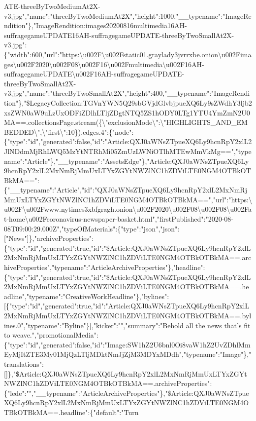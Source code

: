 ATE-threeByTwoMediumAt2X-v3.jpg","name":"threeByTwoMediumAt2X","height":1000,"\_\_typename":"ImageRendition"\},"ImageRendition:images20200816multimedia16AH-suffragegameUPDATE16AH-suffragegameUPDATE-threeByTwoSmallAt2X-v3.jpg":\{"width":600,"url":"https:\textbackslash{}u002F\textbackslash{}u002Fstatic01.graylady3jvrrxbe.onion\textbackslash{}u002Fimages\textbackslash{}u002F2020\textbackslash{}u002F08\textbackslash{}u002F16\textbackslash{}u002Fmultimedia\textbackslash{}u002F16AH-suffragegameUPDATE\textbackslash{}u002F16AH-suffragegameUPDATE-threeByTwoSmallAt2X-v3.jpg","name":"threeByTwoSmallAt2X","height":400,"\_\_typename":"ImageRendition"\},"\$LegacyCollection:TGVnYWN5Q29sbGVjdGlvbjpueXQ6Ly9sZWdhY3ljb2xsZWN0aW9uLzUxODFiZDlhLTljZDgtNTQ5ZS1hODY0LTg1YTU4YmZmN2U0MA==.collectionsPage.stream(\{\textbackslash{}"exclusionMode\textbackslash{}":\textbackslash{}"HIGHLIGHTS\_AND\_EMBEDDED\textbackslash{}",\textbackslash{}"first\textbackslash{}":10\}).edges.4":\{"node":\{"type":"id","generated":false,"id":"Article:QXJ0aWNsZTpueXQ6Ly9hcnRpY2xlL2JlNDdmMjRhLWQ5MzYtNTRhMi05ZmUzLWNiOTlhMTEwMmVkMg==","typename":"Article"\},"\_\_typename":"AssetsEdge"\},"Article:QXJ0aWNsZTpueXQ6Ly9hcnRpY2xlL2MxNmRjMmUxLTYxZGYtNWZlNC1hZDViLTE0NGM4OTBkOTBkMA==":\{"\_\_typename":"Article","id":"QXJ0aWNsZTpueXQ6Ly9hcnRpY2xlL2MxNmRjMmUxLTYxZGYtNWZlNC1hZDViLTE0NGM4OTBkOTBkMA==","url":"https:\textbackslash{}u002F\textbackslash{}u002Fwww.nytimes3xbfgragh.onion\textbackslash{}u002F2020\textbackslash{}u002F08\textbackslash{}u002F08\textbackslash{}u002Fat-home\textbackslash{}u002Fcoronavirus-newspaper-basket.html","firstPublished":"2020-08-08T09:00:29.000Z","typeOfMaterials":\{"type":"json","json":{[}"News"{]}\},"archiveProperties":\{"type":"id","generated":true,"id":"\$Article:QXJ0aWNsZTpueXQ6Ly9hcnRpY2xlL2MxNmRjMmUxLTYxZGYtNWZlNC1hZDViLTE0NGM4OTBkOTBkMA==.archiveProperties","typename":"ArticleArchiveProperties"\},"headline":\{"type":"id","generated":true,"id":"\$Article:QXJ0aWNsZTpueXQ6Ly9hcnRpY2xlL2MxNmRjMmUxLTYxZGYtNWZlNC1hZDViLTE0NGM4OTBkOTBkMA==.headline","typename":"CreativeWorkHeadline"\},"bylines":{[}\{"type":"id","generated":true,"id":"Article:QXJ0aWNsZTpueXQ6Ly9hcnRpY2xlL2MxNmRjMmUxLTYxZGYtNWZlNC1hZDViLTE0NGM4OTBkOTBkMA==.bylines.0","typename":"Byline"\}{]},"kicker":"","summary":"Behold
all the news that's fit to
weave.","promotionalMedia":\{"type":"id","generated":false,"id":"Image:SW1hZ2U6bnl0Oi8vaW1hZ2UvZDhlMmEyMjItZTE3My01MjQzLTljMDktNmJjZjM3MDYxMDdh","typename":"Image"\},"translations":{[}{]}\},"\$Article:QXJ0aWNsZTpueXQ6Ly9hcnRpY2xlL2MxNmRjMmUxLTYxZGYtNWZlNC1hZDViLTE0NGM4OTBkOTBkMA==.archiveProperties":\{"lede":"","\_\_typename":"ArticleArchiveProperties"\},"\$Article:QXJ0aWNsZTpueXQ6Ly9hcnRpY2xlL2MxNmRjMmUxLTYxZGYtNWZlNC1hZDViLTE0NGM4OTBkOTBkMA==.headline":\{"default":"Turn
